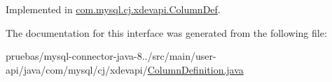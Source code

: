 Implemented in \mbox{\hyperlink{classcom_1_1mysql_1_1cj_1_1xdevapi_1_1_column_def_a2c34dd13c55b62ebb84e7c98a0d01ad3}{com.\+mysql.\+cj.\+xdevapi.\+Column\+Def}}.



The documentation for this interface was generated from the following file\+:\begin{DoxyCompactItemize}
\item 
pruebas/mysql-\/connector-\/java-\/8../src/main/user-\/api/java/com/mysql/cj/xdevapi/\mbox{\hyperlink{user-api_2java_2com_2mysql_2cj_2xdevapi_2_column_definition_8java}{Column\+Definition.\+java}}\end{DoxyCompactItemize}
